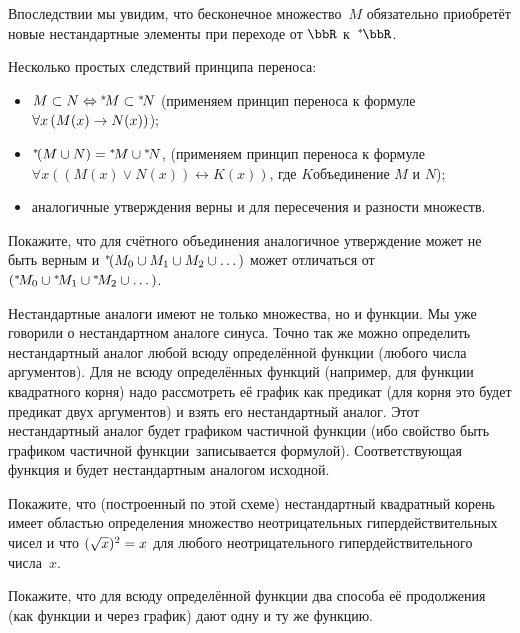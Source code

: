 Впоследствии мы увидим, что бесконечное множество~$M$
обязательно приобретёт новые нестандартные элементы при переходе от $\bbR$
к~$\nstR$.

Несколько простых следствий принципа переноса:
\begin{itemize}
        \item
$M\subset N\Leftrightarrow {}^*\!M\subset{}^*\!N$
(применяем принцип переноса к формуле $\forall x\,(M(x)\hm\to N(x))$);
        \item
${}^*\!(M\cup N)={}^*\!M\cup {}^*\!N$,
(применяем принцип переноса к формуле
$\forall x((M(x)\lor N(x))\leftrightarrow K(x))$, где
$K$\т объединение $M$ и $N$);
        \item
аналогичные утверждения верны и для пересечения и разности множеств.
\end{itemize}

\begin{problem}
Покажите, что для счётного объединения аналогичное утверждение
может не быть верным и ${}^*\!(M_0\cup M_1\cup M_2\cup\dots)$
может отличаться от
$({}^*\!M_0\cup{}^*\!M_1\cup{}^*\!M_2\cup\dots)$.
\end{problem}

Нестандартные аналоги имеют не только множества, но и функции.
Мы уже говорили о нестандартном аналоге синуса. Точно так же
можно определить нестандартный аналог любой всюду определённой
функции (любого числа аргументов). Для не всюду определённых
функций (например, для функции квадратного корня) надо
рассмотреть её график как предикат (для корня это будет предикат
двух аргументов) и взять его нестандартный аналог. Этот
нестандартный аналог будет графиком частичной функции (ибо
свойство  быть графиком частичной функции\ записывается
формулой). Соответствующая функция и будет нестандартным
аналогом исходной.

\begin{problem}
Покажите, что (построенный по этой схеме) нестандартный
квадратный корень имеет областью определения множество
неотрицательных гипердействительных чисел и что
$(\sqrt{x})^2\hm=x$ для любого неотрицательного
гипердействительного числа~$x$.
\end{problem}

\begin{problem}
Покажите, что для всюду определённой функции два способа
её продолжения (как функции и через график) дают одну и
ту же функцию.
\end{problem}

